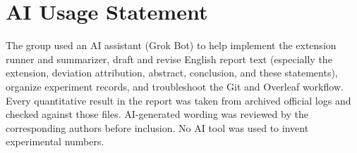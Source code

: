 \documentclass[11pt,a4paper]{article}
\begin{document}
\section*{AI Usage Statement}
The group used an AI assistant (Grok Bot) to help implement the extension
runner and summarizer, draft and revise English report text (especially the
extension, deviation attribution, abstract, conclusion, and these
statements), organize experiment records, and troubleshoot the Git and
Overleaf workflow. Every quantitative result in the report was taken from
archived official logs and checked against those files. AI-generated
wording was reviewed by the corresponding authors before inclusion. No AI
tool was used to invent experimental numbers.



\end{document}
